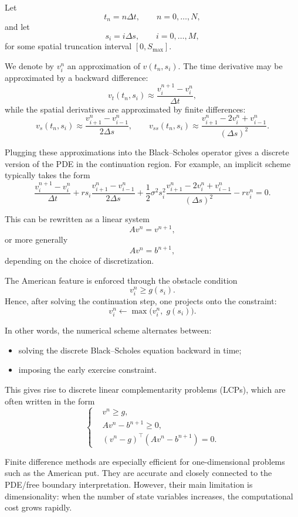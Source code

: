 \documentclass[11pt]{article}
\theoremstyle{definition}
\theoremstyle{plain}
\begin{document}
Let
\[
t_n = n\Delta t,\qquad n=0,\dots,N,
\]
and let
\[
s_i = i\Delta s,\qquad i=0,\dots,M,
\]
for some spatial truncation interval \([0,S_{\max}]\).

We denote by \(v_i^n\) an approximation of \(v(t_n,s_i)\).
The time derivative may be approximated by a backward difference:
\[
v_t(t_n,s_i)
\approx
\frac{v_i^{n+1}-v_i^n}{\Delta t},
\]
while the spatial derivatives are approximated by finite differences:
\[
v_s(t_n,s_i)
\approx
\frac{v_{i+1}^n-v_{i-1}^n}{2\Delta s},
\qquad
v_{ss}(t_n,s_i)
\approx
\frac{v_{i+1}^n-2v_i^n+v_{i-1}^n}{(\Delta s)^2}.
\]

Plugging these approximations into the Black--Scholes operator gives a
discrete version of the PDE in the continuation region.
For example, an implicit scheme typically takes the form
\[
\frac{v_i^{n+1}-v_i^n}{\Delta t}
+
r s_i \frac{v_{i+1}^n-v_{i-1}^n}{2\Delta s}
+
\frac12 \sigma^2 s_i^2
\frac{v_{i+1}^n-2v_i^n+v_{i-1}^n}{(\Delta s)^2}
-
r v_i^n
=0.
\]

This can be rewritten as a linear system
\[
A v^n = v^{n+1},
\]
or more generally
\[
A v^n = b^{n+1},
\]
depending on the choice of discretization.

\medskip

The American feature is enforced through the obstacle condition
\[
v_i^n \ge g(s_i).
\]
Hence, after solving the continuation step, one projects onto the
constraint:
\[
v_i^n \leftarrow \max\big(v_i^n,\; g(s_i)\big).
\]

In other words, the numerical scheme alternates between:
\begin{itemize}[leftmargin=1.4em]
\item solving the discrete Black--Scholes equation backward in time;
\item imposing the early exercise constraint.
\end{itemize}

\medskip

This gives rise to discrete linear complementarity problems (LCPs),
which are often written in the form
\[
\left\{
\begin{aligned}
&v^n \ge g,\\
&A v^n - b^{n+1} \ge 0,\\
&(v^n-g)^\top (A v^n - b^{n+1}) = 0.
\end{aligned}
\right.
\]

Finite difference methods are especially efficient for
one-dimensional problems such as the American put.
They are accurate and closely connected to the PDE/free boundary
interpretation.
However, their main limitation is dimensionality: when the number of
state variables increases, the computational cost grows rapidly.
\end{document}
